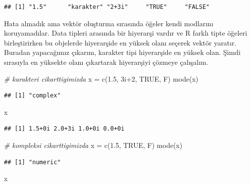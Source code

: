 \documentclass[
]{book}
\newenvironment{Shaded}{\begin{snugshade}}{\end{snugshade}}
\newcommand{\CommentTok}[1]{\textcolor[rgb]{0.56,0.35,0.01}{\textit{#1}}}
\newcommand{\ConstantTok}[1]{\textcolor[rgb]{0.00,0.00,0.00}{#1}}
\newcommand{\DecValTok}[1]{\textcolor[rgb]{0.00,0.00,0.81}{#1}}
\newcommand{\FloatTok}[1]{\textcolor[rgb]{0.00,0.00,0.81}{#1}}
\newcommand{\FunctionTok}[1]{\textcolor[rgb]{0.00,0.00,0.00}{#1}}
\newcommand{\NormalTok}[1]{#1}
\newcommand{\OtherTok}[1]{\textcolor[rgb]{0.56,0.35,0.01}{#1}}
\newcommand{\SpecialCharTok}[1]{\textcolor[rgb]{0.00,0.00,0.00}{#1}}
\begin{document}
\begin{verbatim}
## [1] "1.5"      "karakter" "2+3i"     "TRUE"     "FALSE"
\end{verbatim}

Hata almadık ama vektör oluşturma sırasında öğeler kendi modlarını koruyamadılar. Data tipleri arasında bir hiyerarşi vardır ve R farklı tipte öğeleri birleştirirken bu objelerde hiyerarşide en yüksek olanı seçerek vektör yaratır. Buradan yapacağımız çıkarım, karakter tipi hiyerarşide en yüksek olan. Şimdi sırasıyla en yüksekte olanı çıkartarak hiyerarşiyi çözmeye çalışalım.

\begin{Shaded}
\begin{Highlighting}[]
\CommentTok{\# karakteri cikarttigimizda}
\NormalTok{x }\OtherTok{=} \FunctionTok{c}\NormalTok{(}\FloatTok{1.5}\NormalTok{, 3i}\SpecialCharTok{+}\DecValTok{2}\NormalTok{, }\ConstantTok{TRUE}\NormalTok{, F)}
\FunctionTok{mode}\NormalTok{(x)}
\end{Highlighting}
\end{Shaded}

\begin{verbatim}
## [1] "complex"
\end{verbatim}

\begin{Shaded}
\begin{Highlighting}[]
\NormalTok{x }
\end{Highlighting}
\end{Shaded}

\begin{verbatim}
## [1] 1.5+0i 2.0+3i 1.0+0i 0.0+0i
\end{verbatim}

\begin{Shaded}
\begin{Highlighting}[]
\CommentTok{\# kompleksi cikarttigimizda}
\NormalTok{x }\OtherTok{=} \FunctionTok{c}\NormalTok{(}\FloatTok{1.5}\NormalTok{, }\ConstantTok{TRUE}\NormalTok{, F)}
\FunctionTok{mode}\NormalTok{(x)}
\end{Highlighting}
\end{Shaded}

\begin{verbatim}
## [1] "numeric"
\end{verbatim}

\begin{Shaded}
\begin{Highlighting}[]
\NormalTok{x}
\end{Highlighting}
\end{Shaded}
\end{document}
